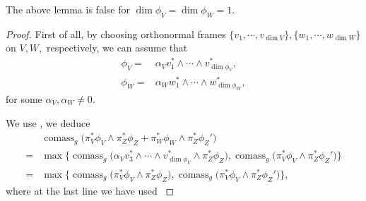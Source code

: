 \documentclass[11pt,a4paper]{amsart}
\numberwithin{equation}{section}
\newcommand{\ai}{\alpha}
\newcommand{\cms}{\operatorname{comass}}
\newcommand{\cd}{\cdots}
\newcommand{\du}{^\ast}
\newcommand{\w}{\wedge}
\theoremstyle{plain}
\theoremstyle{definition}
\numberwithin{equation}{subsection}
\begin{document}
The above lemma is false for $\dim\phi_V=\dim\phi_W=1.$
\begin{proof}
First of all, by choosing orthonormal frames $\{v_1,\cd,v_{\dim V}\},\{w_1,\cd,w_{\dim W}\}$ on $V,W,$ respectively, we can assume that
\begin{align*}
	\phi_V=&\ai_Vv_1\du\w\cd\w v_{\dim\phi_V}\du,\\
	\phi_W=&\ai_W w_1\du\w\cd\w w_{\dim \phi_W}\du,
\end{align*}
for some $\ai_V,\ai_W\not=0.$

We use \cite[Lemma 2.1  with $e=v_1,f=v_2,\psi=\ai_Vv_3\w\cd\w v_{\dim \phi_V}\w\pi_Z\du \phi_Z,\chi=\pi_W\du\phi_W\w\pi_Z\du\phi_Z',$]{DHM}, we deduce
\begin{align*}
	& \cms_g \bigg(\pi_V\du\phi_V\w \pi_Z\du\phi_Z+\pi_W\du\phi_W\w\pi_Z\du\phi_Z'\bigg)\\=&\max\bigg\{\cms_{g}\big(\ai_Vv_3\du\w\cd\w v\du_{\dim \phi_V}\w\pi_Z\du \phi_Z\big),\cms_{g}\big(\pi_V\du\phi_V\w \pi_Z\du\phi_Z'\big)\bigg\}\\
=&\max\bigg\{\cms_{g}\big(\pi_V\du\phi_V\w \pi_Z\du\phi_Z\big),\cms_{g}\big(\pi_V\du\phi_V\w \pi_Z\du\phi_Z'\big)\bigg\},
	\end{align*}where at the last line we have used \cite[Proposition 7.10]{HL}\end{proof}
\end{document}
